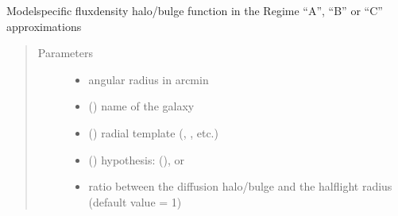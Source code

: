 \documentclass[letterpaper,10pt,english]{sphinxmanual}
\begin{document}

\begin{fulllineitems}
\label{\detokenize{diffsph.profiles:diffsph.profiles.massmodels.Hfd}}
\sphinxAtStartPar
Model\sphinxhyphen{}specific flux\sphinxhyphen{}density halo/bulge function in the Regime “A”, “B” or “C” approximations
\begin{quote}\begin{description}
\item[{Parameters}] \leavevmode\begin{itemize}
\item {} 
\sphinxAtStartPar
{} \textendash{} angular radius in arcmin

\item {} 
\sphinxAtStartPar
{} () \textendash{} name of the galaxy

\item {} 
\sphinxAtStartPar
{} () \textendash{} radial template (, , etc.)

\item {} 
\sphinxAtStartPar
{} () \textendash{} hypothesis:  (),  or 

\item {} 
\sphinxAtStartPar
{} \textendash{} ratio between the diffusion halo/bulge and the half\sphinxhyphen{}light radius (default value = 1)


\end{itemize}
\end{description}
\end{quote}
\end{fulllineitems}
\end{document}

